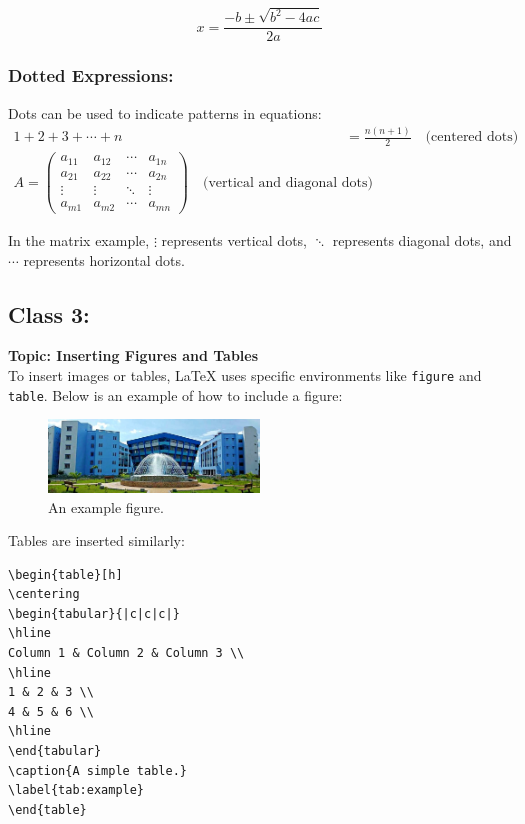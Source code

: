 \begin{equation}
    x = \frac{-b \pm \sqrt{b^2 - 4ac}}{2a}
\end{equation}

\subsubsection{Dotted Expressions:}
Dots can be used to indicate patterns in equations:
\begin{align}
    1 + 2 + 3 + \cdots + n &= \frac{n(n+1)}{2} \quad \text{(centered dots)} \\
    A = \begin{pmatrix} 
            a_{11} & a_{12} & \cdots & a_{1n} \\
            a_{21} & a_{22} & \cdots & a_{2n} \\
            \vdots & \vdots & \ddots & \vdots \\
            a_{m1} & a_{m2} & \cdots & a_{mn} 
        \end{pmatrix} \quad \text{(vertical and diagonal dots)}
\end{align}

In the matrix example, $\vdots$ represents vertical dots, $\ddots$ represents diagonal dots, and $\cdots$ represents horizontal dots.

\subsection{Class 3:}
\textbf{Topic: Inserting Figures and Tables} \\

To insert images or tables, \LaTeX{} uses specific environments like \texttt{figure} and \texttt{table}. Below is an example of how to include a figure:

\begin{figure}[h]
    \centering
    \includegraphics[width=0.5\textwidth]{Topics/Images/makaut.jpg}
    \caption{An example figure.}
    \label{fig:fig_example}
\end{figure}

Tables are inserted similarly:
\begin{verbatim}
\begin{table}[h]
\centering
\begin{tabular}{|c|c|c|}
\hline
Column 1 & Column 2 & Column 3 \\
\hline
1 & 2 & 3 \\
4 & 5 & 6 \\
\hline
\end{tabular}
\caption{A simple table.}
\label{tab:example}
\end{table}
\end{verbatim}

